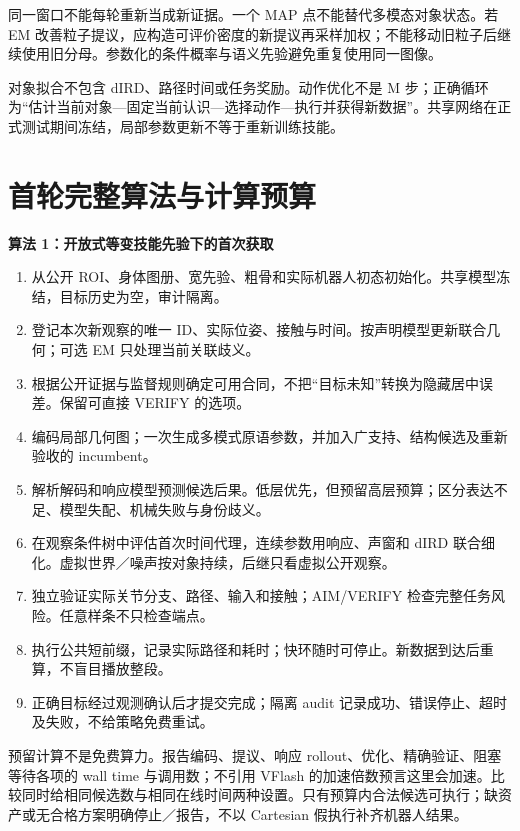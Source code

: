 \documentclass[UTF8,fontset=fandol,11pt,a4paper]{ctexart}
\theoremstyle{plain}
\theoremstyle{definition}
\theoremstyle{remark}
\numberwithin{equation}{section}
\begin{document}
同一窗口不能每轮重新当成新证据。一个 MAP 点不能替代多模态对象状态。若 EM 改善粒子提议，应构造可评价密度的新提议再采样加权；不能移动旧粒子后继续使用旧分母。参数化的条件概率与语义先验避免重复使用同一图像。

对象拟合不包含 dIRD、路径时间或任务奖励。动作优化不是 M 步；正确循环为“估计当前对象—固定当前认识—选择动作—执行并获得新数据”。共享网络在正式测试期间冻结，局部参数更新不等于重新训练技能。

\section{首轮完整算法与计算预算}
\label{sec:algorithm}
\begin{scopebox}
\textbf{算法 1：开放式等变技能先验下的首次获取}
\begin{enumerate}
\item 从公开 ROI、身体图册、宽先验、粗骨和实际机器人初态初始化。共享模型冻结，目标历史为空，审计隔离。
\item 登记本次新观察的唯一 ID、实际位姿、接触与时间。按声明模型更新联合几何；可选 EM 只处理当前关联歧义。
\item 根据公开证据与监督规则确定可用合同，不把“目标未知”转换为隐藏居中误差。保留可直接 VERIFY 的选项。
\item 编码局部几何图；一次生成多模式原语参数，并加入广支持、结构候选及重新验收的 incumbent。
\item 解析解码和响应模型预测候选后果。低层优先，但预留高层预算；区分表达不足、模型失配、机械失败与身份歧义。
\item 在观察条件树中评估首次时间代理，连续参数用响应、声窗和 dIRD 联合细化。虚拟世界／噪声按对象持续，后继只看虚拟公开观察。
\item 独立验证实际关节分支、路径、输入和接触；AIM/VERIFY 检查完整任务风险。任意样条不只检查端点。
\item 执行公共短前缀，记录实际路径和耗时；快环随时可停止。新数据到达后重算，不盲目播放整段。
\item 正确目标经过观测确认后才提交完成；隔离 audit 记录成功、错误停止、超时及失败，不给策略免费重试。
\end{enumerate}
\end{scopebox}

预留计算不是免费算力。报告编码、提议、响应 rollout、优化、精确验证、阻塞等待各项的 wall time 与调用数；不引用 VFlash 的加速倍数预言这里会加速。比较同时给相同候选数与相同在线时间两种设置。只有预算内合法候选可执行；缺资产或无合格方案明确停止／报告，不以 Cartesian 假执行补齐机器人结果。
\end{document}
